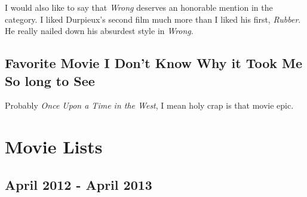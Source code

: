 \documentclass[11pt]{article}
\begin{document}
I would also like to say that \emph{Wrong} deserves an honorable mention in the category. I liked Durpieux's second film much more than I liked his first, \emph{Rubber}. He really nailed down his absurdest style in \emph{Wrong}.

\subsection{Favorite Movie I Don't Know Why it Took Me So long to See}
Probably \emph{Once Upon a Time in the West}, I mean holy crap is that movie epic.

\section{Movie Lists}
\subsection{April 2012 - April 2013}
\end{document}
